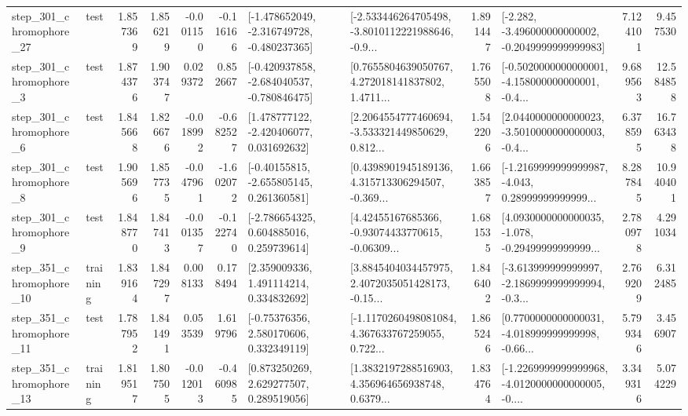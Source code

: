 \begin{tabular}{llrrrrllrlrr}
  step\_301\_chromophore\_27 &      test &      1.857369 &    1.856219 &     -0.001150 & -0.116166 &  [-1.478652049, -2.316749728, -0.480237365] &  [-2.533446264705498, -3.8010112221988646, -0.9... &       1.891447 &  [-2.282, -3.496000000000002, -0.2049999999999983] &            7.124101 &          9.457530 \\
   step\_301\_chromophore\_3 &      test &      1.874376 &    1.903747 &      0.029372 &  0.852667 &  [-0.420937858, -2.684040537, -0.780846475] &  [0.7655804639050767, 4.272018141837802, 1.4711... &       1.765508 &  [-0.5020000000000001, -4.158000000000001, -0.4... &            9.689563 &         12.584858 \\
   step\_301\_chromophore\_6 &      test &      1.845668 &    1.826676 &     -0.018992 & -0.682527 &    [1.478777122, -2.420406077, 0.031692632] &  [2.2064554777460694, -3.533321449850629, 0.812... &       1.542206 &  [2.0440000000000023, -3.5010000000000003, -0.4... &            6.378595 &         16.763438 \\
   step\_301\_chromophore\_8 &      test &      1.905696 &    1.857735 &     -0.047961 & -1.602072 &    [-0.40155815, -2.655805145, 0.261360581] &  [0.4398901945189136, 4.315713306294507, -0.369... &       1.663857 &  [-1.2169999999999987, -4.043, 0.28999999999999... &            8.287845 &         10.940401 \\
   step\_301\_chromophore\_9 &      test &      1.848770 &    1.847413 &     -0.001357 & -0.122740 &    [-2.786654325, 0.604885016, 0.259739614] &  [4.42455167685366, -0.93074433770615, -0.06309... &       1.681535 &  [4.0930000000000035, -1.078, -0.29499999999999... &            2.780978 &          4.291034 \\
  step\_351\_chromophore\_10 &  training &      1.839164 &    1.847297 &      0.008133 &  0.178494 &     [2.359009336, 1.491114214, 0.334832692] &  [3.8845404034457975, 2.4072035051428173, -0.15... &       1.846402 &  [-3.613999999999997, -2.1869999999999994, -0.3... &            2.769209 &          6.312485 \\
  step\_351\_chromophore\_11 &      test &      1.787952 &    1.841491 &      0.053539 &  1.619796 &     [-0.75376356, 2.580170606, 0.332349119] &  [-1.1170260498081084, 4.367633767259055, 0.722... &       1.865246 &  [0.7700000000000031, -4.018999999999998, -0.66... &            5.799346 &          3.456907 \\
  step\_351\_chromophore\_13 &  training &      1.819517 &    1.807505 &     -0.012013 & -0.460985 &     [0.873250269, 2.629277507, 0.289519056] &  [1.3832197288516903, 4.356964656938748, 0.6379... &       1.834764 &  [-1.2269999999999968, -4.0120000000000005, -0.... &            3.349316 &          5.074229 \\

\end{tabular}
